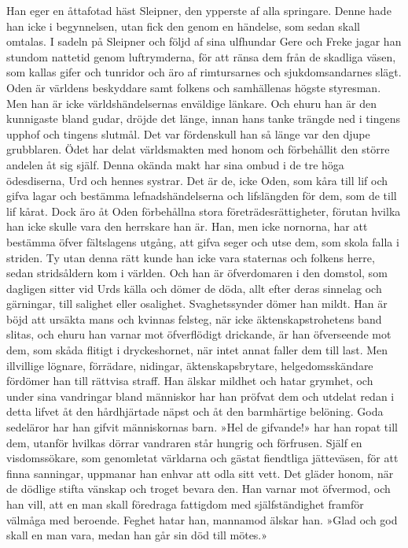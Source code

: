 Han eger en åttafotad häst Sleipner, den ypperste af alla springare.
Denne hade han icke i begynnelsen, utan fick den genom en händelse, som
sedan skall omtalas. I sadeln på Sleipner och följd af sina ulfhundar
Gere och Freke
\protect\hypertarget{lb1625905.xhtmlux5cux23start26}{}{}\protect\hypertarget{lb1625905.xhtmlux5cux23start26-a}{}{}\protect\hypertarget{lb1625905.xhtmlux5cux23start26-b}{}{}\protect\hypertarget{lb1625905.xhtmlux5cux23start26-c}{}{}\protect\hypertarget{lb1625905.xhtmlux5cux23start26-d}{}{}
jagar han stundom nattetid genom luftrymderna, för att ränsa dem från de
skadliga väsen, som kallas gifer och tunridor och äro af rimtursarnes
och sjukdomsandarnes slägt. Oden är världens beskyddare samt folkens och
samhällenas högste styresman. Men han är icke världshändelsernas
enväldige länkare. Och ehuru han är den kunnigaste bland gudar, dröjde
det länge, innan hans tanke trängde ned i tingens upphof och tingens
slutmål. Det var fördenskull han så länge var den djupe grubblaren. Ödet
har delat världsmakten med honom och förbehållit den större andelen åt
sig själf. Denna okända makt har sina ombud i de tre höga ödesdiserna,
Urd och hennes systrar. Det är de, icke Oden, som kåra till lif och
gifva lagar och bestämma lefnadshändelserna och lifslängden för dem, som
de till lif kårat. Dock äro åt Oden förbehållna stora
företrädesrättigheter, förutan hvilka han icke skulle vara den herrskare
han är. Han, men icke nornorna, har att bestämma öfver fältslagens
utgång, att gifva seger och utse dem, som skola falla i striden. Ty utan
denna rätt kunde han icke vara staternas och folkens herre, sedan
stridsåldern kom i världen. Och han är öfverdomaren i den domstol, som
dagligen sitter vid Urds källa och dömer de döda, allt efter deras
sinnelag och gärningar, till salighet eller osalighet. Svaghetssynder
dömer han mildt. Han är böjd att ursäkta mans och kvinnas felsteg, när
icke äktenskapstrohetens band slitas, och ehuru han varnar mot
öfverflödigt drickande, är han öfverseende mot dem, som skåda flitigt i
dryckeshornet, när intet annat faller dem till last. Men illvillige
lögnare, förrädare, nidingar, äktenskapsbrytare, helgedomsskändare
fördömer han till rättvisa straff. Han älskar mildhet och hatar grymhet,
och under sina vandringar bland människor har han pröfvat dem och
utdelat redan i detta lifvet åt den hårdhjärtade näpst och åt den
barmhärtige belöning. Goda sedeläror har han gifvit människornas barn.
»Hel de gifvande!» har han ropat till dem, utanför hvilkas dörrar
vandraren står hungrig och förfrusen. Själf en visdomssökare, som
genomletat världarna och gästat fiendtliga jätteväsen, för att finna
\protect\hypertarget{lb1625905.xhtmlux5cux23start27}{}{}\protect\hypertarget{lb1625905.xhtmlux5cux23start27-a}{}{}\protect\hypertarget{lb1625905.xhtmlux5cux23start27-b}{}{}\protect\hypertarget{lb1625905.xhtmlux5cux23start27-c}{}{}\protect\hypertarget{lb1625905.xhtmlux5cux23start27-d}{}{}
sanningar, uppmanar han enhvar att odla sitt vett. Det gläder honom, när
de dödlige stifta vänskap och troget bevara den. Han varnar mot
öfvermod, och han vill, att en man skall föredraga fattigdom med
själfständighet framför välmåga med beroende. Feghet hatar han, mannamod
älskar han. »Glad och god skall en man vara, medan han går sin död till
mötes.»

